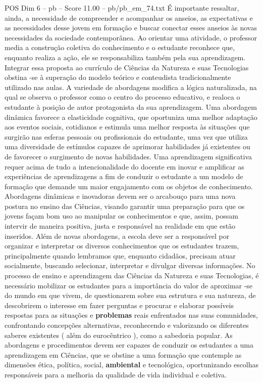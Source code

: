 \begin{textsample}{POS Dim 6 – pb – Score 11.00 – pb/pb\_em\_74.txt}
É importante ressaltar, ainda, a necessidade de compreender e acompanhar os anseios, as expectativas e as necessidades desse jovem em formação e buscar conectar esses anseios às novas necessidades da sociedade contemporânea.
Ao orientar uma atividade, o professor media a construção coletiva do conhecimento e o estudante reconhece que, enquanto realiza a ação, ele se responsabiliza também pela sua aprendizagem.
Integrar essa proposta ao currículo de Ciências da Natureza e suas Tecnologias obstina -se à superação do modelo teórico e conteudista tradicionalmente utilizado nas aulas.
A variedade de abordagens modifica a lógica naturalizada, na qual se observa o professor como o centro do processo educativo, e realoca o estudante à posição de autor protagonista da sua aprendizagem.
Uma abordagem dinâmica favorece a elasticidade cognitiva, que oportuniza uma melhor adaptação aos eventos sociais, cotidianos e estimula uma melhor resposta às situações que surgirão nas esferas pessoais ou profissionais do estudante, uma vez que utiliza uma diversidade de estímulos capazes de aprimorar habilidades já existentes ou de favorecer o surgimento de novas habilidades.
Uma aprendizagem significativa requer acima de tudo a intencionalidade do docente em inovar e amplificar as experiências de aprendizagens a fim de conduzir o estudante a um modelo de formação que demande um maior engajamento com os objetos de conhecimento.
Abordagens dinâmicas e inovadoras devem ser o arcabouço para uma nova postura no ensino das Ciências, visando garantir uma preparação para que os jovens façam bom uso ao manipular os conhecimentos e que, assim, possam intervir de maneira positiva, justa e responsável na realidade em que estão inseridos.
Além de novas abordagens, a escola deve ser a responsável por organizar e interpretar os diversos conhecimentos que os estudantes trazem, principalmente quando lembramos que, enquanto cidadãos, precisam atuar socialmente, buscando selecionar, interpretar e divulgar diversas informações.
No processo de ensino e aprendizagem das Ciências da Natureza e suas Tecnologias, é necessário mobilizar os estudantes para a importância do valor de aproximar -se do mundo em que vivem, de questionarem sobre sua estrutura e sua natureza, de descobrirem o interesse em fazer perguntas e procurar e elaborar possíveis respostas para as situações e \textbf{problemas} reais enfrentados nas suas comunidades, confrontando concepções alternativas, reconhecendo e valorizando os diferentes saberes existentes ( além do eurocêntrico ), como a sabedoria popular.
As abordagens e procedimentos devem ser capazes de conduzir os estudantes a uma aprendizagem em Ciências, que se obstine a uma formação que contemple as dimensões ética, política, social, \textbf{ambiental} e tecnológica, oportunizando escolhas responsáveis para a melhoria da qualidade de vida individual e coletiva.

\end{textsample}
